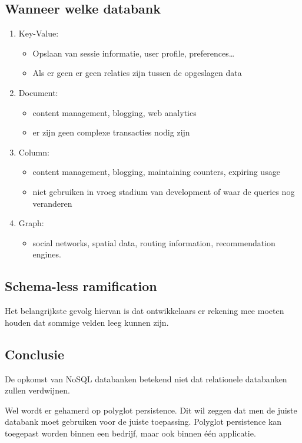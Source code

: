 \documentclass[a4paper,12pt]{article}
\begin{document}
\subsection{Wanneer welke databank}
\begin{enumerate}
\item Key-Value:
	\begin{itemize}
	\item Opslaan van sessie informatie, user profile, preferences\ldots
	\item Als er geen er geen relaties zijn tussen de opgeslagen data
	\end{itemize}
\item Document:
	\begin{itemize}
	\item content management, blogging, web analytics
	\item er zijn geen complexe transacties nodig zijn 
	\end{itemize}
\item Column:
	\begin{itemize}
	\item content management, blogging, maintaining counters, expiring usage
	\item niet gebruiken in vroeg stadium van development of waar de queries nog veranderen
	\end{itemize}
\item Graph:
	\begin{itemize}
	\item social networks, spatial data, routing information, recommendation engines.
	\end{itemize}
\end{enumerate}

\subsection{Schema-less ramification}
Het belangrijkste gevolg hiervan is dat ontwikkelaars er rekening mee moeten houden dat sommige velden leeg kunnen zijn.

\subsection{Conclusie}
De opkomst van NoSQL databanken betekend niet dat relationele databanken zullen verdwijnen.

Wel wordt er gehamerd op polyglot persistence.
Dit wil zeggen dat men de juiste databank moet gebruiken voor de juiste toepassing.
Polyglot persistence kan toegepast worden binnen een bedrijf, maar ook binnen één applicatie.
\end{document}
